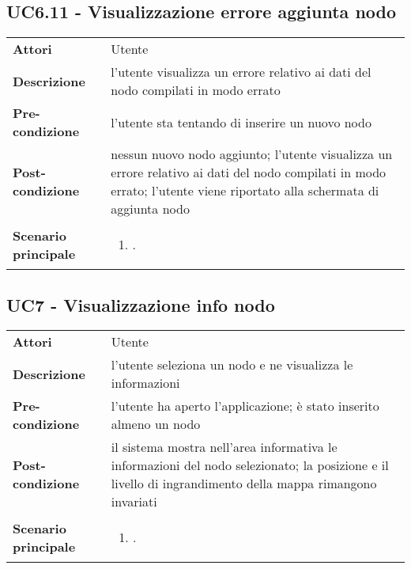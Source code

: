 \subsection{UC6.11 - Visualizzazione errore aggiunta nodo} 
\label{sssec:UC6.11} 
\def\arraystretch{1.5}
\begin{tabularx}{\textwidth}{l|p{}}
	\rowcolor{I} \multicolumn{2}{c}{\color{white}\textbf{UC6.11 - Visualizzazione errore aggiunta nodo}} \\
	\toprule
	\endhead
	\textbf{Attori} & Utente\\
	\textbf{Descrizione} & l'utente visualizza un errore relativo ai dati del nodo compilati in modo errato\\
	\textbf{Pre-condizione} & l'utente sta tentando di inserire un nuovo nodo\\
	\textbf{Post-condizione} & nessun nuovo nodo aggiunto; l'utente visualizza un errore relativo ai dati del nodo compilati in modo errato; l'utente viene riportato alla schermata di aggiunta nodo\\
	\textbf{Scenario principale} & \vspace{-1.2em}\begin{enumerate}[leftmargin=*,noitemsep,nosep]
		\item \nameref{sssec:UC6.11}.
	\end{enumerate}\\
	\bottomrule
\end{tabularx}
\subsection{UC7 - Visualizzazione info nodo} 
\label{sssec:UC7} 
\def\arraystretch{1.5}
\begin{tabularx}{\textwidth}{l|p{}}
	\rowcolor{I} \multicolumn{2}{c}{\color{white}\textbf{UC7 - Visualizzazione info nodo}} \\
	\toprule
	\endhead
	\textbf{Attori} & Utente\\
	\textbf{Descrizione} & l'utente seleziona un nodo e ne visualizza le informazioni\\
	\textbf{Pre-condizione} & l'utente ha aperto l'applicazione; è stato inserito almeno un nodo\\
	\textbf{Post-condizione} & il sistema mostra nell'area informativa le informazioni del nodo selezionato; la posizione e il livello di ingrandimento della mappa rimangono invariati\\
	\textbf{Scenario principale} & \vspace{-1.2em}\begin{enumerate}[leftmargin=*,noitemsep,nosep]
		\item \nameref{sssec:UC7}.
	\end{enumerate}\\
	\bottomrule
\end{tabularx}
